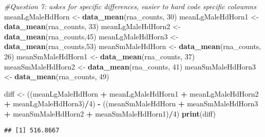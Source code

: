 \documentclass[]{article}
\newenvironment{Shaded}{\begin{snugshade}}{\end{snugshade}}
\newcommand{\KeywordTok}[1]{\textcolor[rgb]{0.13,0.29,0.53}{\textbf{#1}}}
\newcommand{\DecValTok}[1]{\textcolor[rgb]{0.00,0.00,0.81}{#1}}
\newcommand{\StringTok}[1]{\textcolor[rgb]{0.31,0.60,0.02}{#1}}
\newcommand{\CommentTok}[1]{\textcolor[rgb]{0.56,0.35,0.01}{\textit{#1}}}
\newcommand{\OperatorTok}[1]{\textcolor[rgb]{0.81,0.36,0.00}{\textbf{#1}}}
\newcommand{\NormalTok}[1]{#1}
\begin{document}
\begin{Shaded}
\begin{Highlighting}[]
\CommentTok{#Question 7: askes for specific differences, easier to hard code specific coloumns}
\NormalTok{meanLgMaleHdHorn <-}\StringTok{ }\KeywordTok{data_mean}\NormalTok{(rna_counts, }\DecValTok{30}\NormalTok{)}
\NormalTok{meanLgMaleHdHorn1 <-}\StringTok{ }\KeywordTok{data_mean}\NormalTok{(rna_counts, }\DecValTok{33}\NormalTok{)}
\NormalTok{meanLgMaleHdHorn2 <-}\StringTok{ }\KeywordTok{data_mean}\NormalTok{(rna_counts,}\DecValTok{45}\NormalTok{)}
\NormalTok{meanLgMaleHdHorn3 <-}\StringTok{ }\KeywordTok{data_mean}\NormalTok{(rna_counts,}\DecValTok{53}\NormalTok{)}
\NormalTok{meanSmMaleHdHorn <-}\StringTok{ }\KeywordTok{data_mean}\NormalTok{(rna_counts, }\DecValTok{26}\NormalTok{)}
\NormalTok{meanSmMaleHdHorn1 <-}\StringTok{ }\KeywordTok{data_mean}\NormalTok{(rna_counts, }\DecValTok{37}\NormalTok{)}
\NormalTok{meanSmMaleHdHorn2 <-}\StringTok{ }\KeywordTok{data_mean}\NormalTok{(rna_counts, }\DecValTok{41}\NormalTok{)}
\NormalTok{meanSmMaleHdHorn3 <-}\StringTok{ }\KeywordTok{data_mean}\NormalTok{(rna_counts, }\DecValTok{49}\NormalTok{)}

\NormalTok{diff <-}\StringTok{ }\NormalTok{((meanLgMaleHdHorn }\OperatorTok{+}\StringTok{ }\NormalTok{meanLgMaleHdHorn1 }\OperatorTok{+}\StringTok{ }\NormalTok{meanLgMaleHdHorn2 }\OperatorTok{+}\StringTok{ }\NormalTok{meanLgMaleHdHorn3)}\OperatorTok{/}\DecValTok{4}\NormalTok{) }\OperatorTok{-}\StringTok{ }\NormalTok{((meanSmMaleHdHorn }\OperatorTok{+}\StringTok{ }\NormalTok{meanSmMaleHdHorn3 }\OperatorTok{+}\StringTok{ }\NormalTok{meanSmMaleHdHorn2 }\OperatorTok{+}\StringTok{ }\NormalTok{meanSmMaleHdHorn1)}\OperatorTok{/}\DecValTok{4}\NormalTok{)}
\KeywordTok{print}\NormalTok{(diff)}
\end{Highlighting}
\end{Shaded}

\begin{verbatim}
## [1] 516.8667
\end{verbatim}
\end{document}
